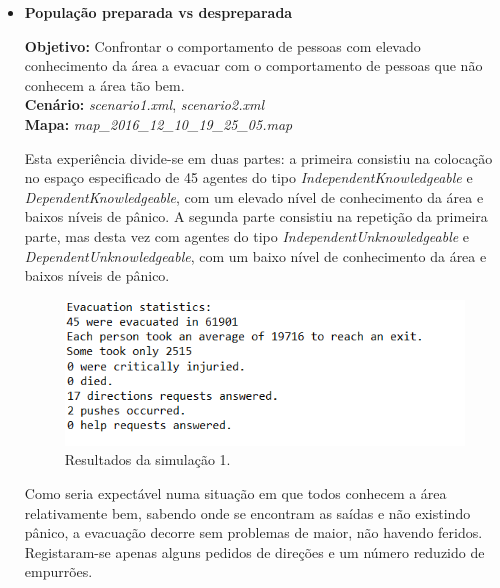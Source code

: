 \documentclass[12pt]{article}
\begin{document}
\begin{titlepage}
\begin{itemize}
	\item \textbf{População preparada vs despreparada}

\textbf{Objetivo:} 
Confrontar o comportamento de pessoas com elevado conhecimento da área a evacuar com o comportamento de pessoas que não conhecem a área tão bem.
\\\textbf{Cenário:} 
\textit{scenario1.xml}, \textit{scenario2.xml}
\\\textbf{Mapa:} 
\textit{map\_2016\_12\_10\_19\_25\_05.map}
\newline


Esta experiência divide-se em duas partes: a primeira consistiu na colocação no espaço especificado de 45 agentes do tipo \textit{IndependentKnowledgeable} e \textit{DependentKnowledgeable}, com um elevado nível de conhecimento da área e baixos níveis de pânico. A segunda parte consistiu na repetição da primeira parte, mas desta vez com agentes do tipo \textit{IndependentUnknowledgeable} e \textit{DependentUnknowledgeable}, com um baixo nível de conhecimento da área e  baixos níveis de pânico.

\begin{figure}[H]
	\centering
	\includegraphics{log_sc1.png}
	\caption{Resultados da simulação 1.}
	\label{log_sc1}
\end{figure}

Como seria expectável numa situação em que todos conhecem a área relativamente bem, sabendo onde se encontram as saídas e não existindo pânico, a evacuação decorre sem problemas de maior, não havendo feridos. Registaram-se apenas alguns pedidos de direções e um número reduzido de empurrões.


\end{itemize}
\end{titlepage}
\end{document}
